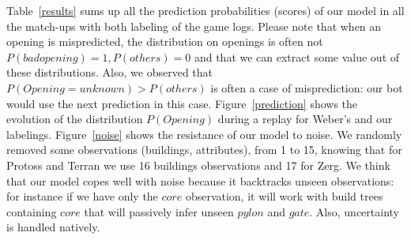 Table~\ref{results} sums up all the prediction probabilities (scores) of our model in all the match-ups with both labeling of the game logs. Please note that when an opening is mispredicted, the distribution on openings is often not $P(badopening)=1, P(others)=0$ and that we can extract some value out of these distributions. Also, we observed that $P(Opening=unknown)>P(others)$ is often a case of misprediction: our bot would use the next prediction in this case. Figure~\ref{prediction} shows the evolution of the distribution $P(Opening)$ during a replay for Weber's and our labelings. Figure~\ref{noise} shows the resistance of our model to noise. We randomly removed some observations (buildings, attributes), from 1 to 15, knowing that for Protoss and Terran we use 16 buildings observations and 17 for Zerg. We think that our model copes well with noise because it backtracks unseen observations: for instance if we have only the $core$ observation, it will work with build trees containing $core$ that will passively infer unseen $pylon$ and $gate$. Also, uncertainty is handled natively.



